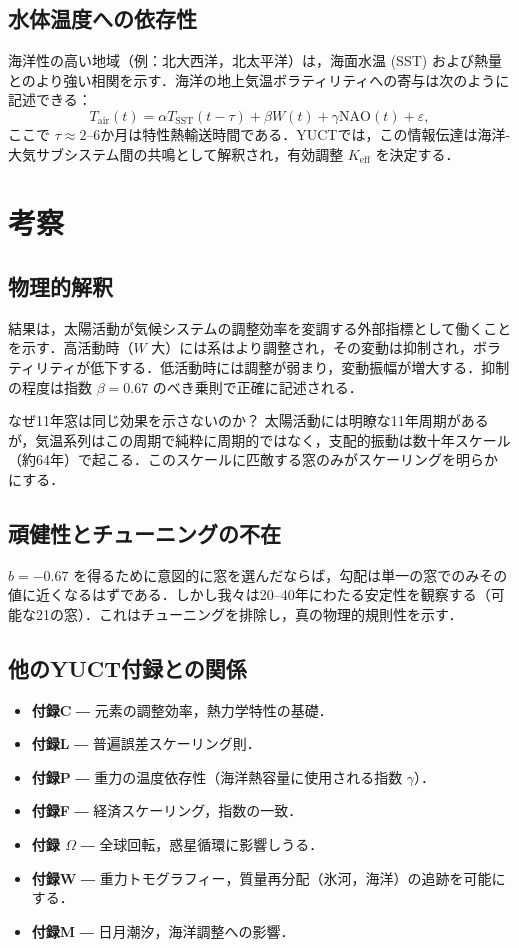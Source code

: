 \documentclass[11pt,a4paper]{article}
\newcommand{\Keff}{K_{\mathrm{eff}}}
\newcommand{\be}{\beta}
\newcommand{\ga}{\gamma}
\begin{document}
	\subsection{水体温度への依存性}
	
	海洋性の高い地域（例：北大西洋，北太平洋）は，海面水温 (SST) および熱量とのより強い相関を示す．海洋の地上気温ボラティリティへの寄与は次のように記述できる：
	\[
	T_{\text{air}}(t) = \alpha T_{\text{SST}}(t-\tau) + \beta W(t) + \gamma \text{NAO}(t) + \varepsilon,
	\]
	ここで $\tau \approx 2$–6か月は特性熱輸送時間である．YUCTでは，この情報伝達は海洋-大気サブシステム間の共鳴として解釈され，有効調整 $\Keff$ を決定する．
	
	\section{考察}
	
	\subsection{物理的解釈}
	
	結果は，太陽活動が気候システムの調整効率を変調する外部指標として働くことを示す．高活動時（$W$ 大）には系はより調整され，その変動は抑制され，ボラティリティが低下する．低活動時には調整が弱まり，変動振幅が増大する．抑制の程度は指数 $\be = 0.67$ のべき乗則で正確に記述される．
	
	なぜ11年窓は同じ効果を示さないのか？ 太陽活動には明瞭な11年周期があるが，気温系列はこの周期で純粋に周期的ではなく，支配的振動は数十年スケール（約64年）で起こる．このスケールに匹敵する窓のみがスケーリングを明らかにする．
	
	\subsection{頑健性とチューニングの不在}
	
	$b = -0.67$ を得るために意図的に窓を選んだならば，勾配は単一の窓でのみその値に近くなるはずである．しかし我々は20–40年にわたる安定性を観察する（可能な21の窓）．これはチューニングを排除し，真の物理的規則性を示す．
	
	\subsection{他のYUCT付録との関係}
	
	\begin{itemize}
		\item \textbf{付録C} ― 元素の調整効率，熱力学特性の基礎．
		\item \textbf{付録L} ― 普遍誤差スケーリング則．
		\item \textbf{付録P} ― 重力の温度依存性（海洋熱容量に使用される指数 $\ga$）．
		\item \textbf{付録F} ― 経済スケーリング，指数の一致．
		\item \textbf{付録 $\Omega$} ― 全球回転，惑星循環に影響しうる．
		\item \textbf{付録W} ― 重力トモグラフィー，質量再分配（氷河，海洋）の追跡を可能にする．
		\item \textbf{付録M} ― 日月潮汐，海洋調整への影響．
	\end{itemize}
	
\end{document}
